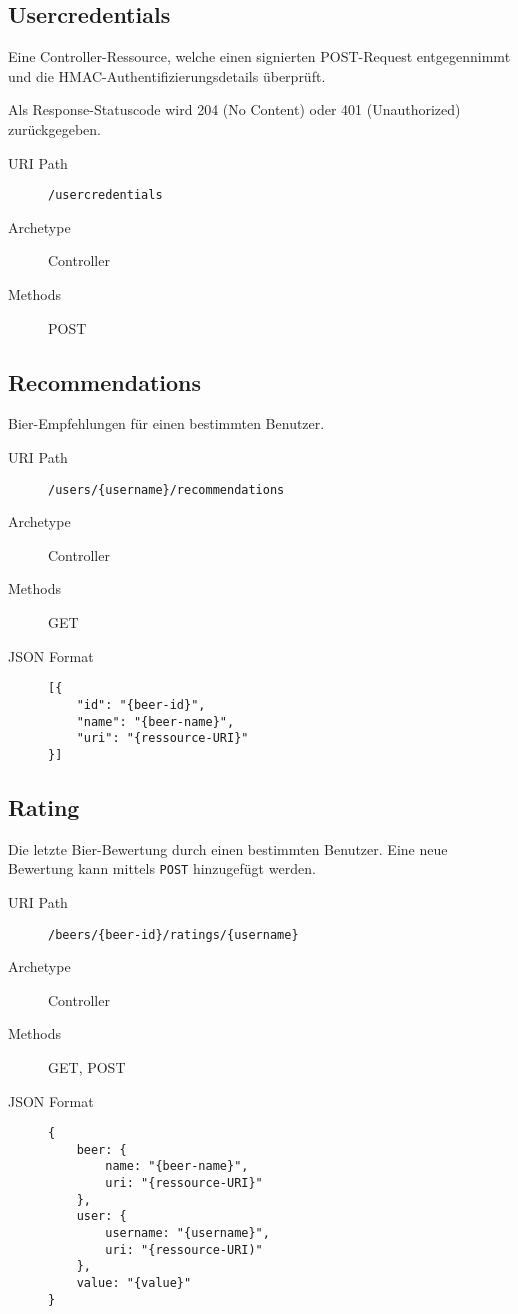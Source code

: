 \documentclass[10pt,a4paper]{scrartcl}
\begin{document}
\subsection{Usercredentials}

Eine Controller-Ressource, welche einen signierten POST-Request entgegennimmt und die
HMAC-Authentifizierungsdetails überprüft.

Als Response-Statuscode wird 204 (No Content) oder 401 (Unauthorized) zurückgegeben.

\begin{description}
	\item[URI Path] \texttt{/usercredentials}
	\item[Archetype] Controller
	\item[Methods] POST
\end{description}


\subsection{Recommendations}

Bier-Empfehlungen für einen bestimmten Benutzer.

\begin{description}
	\item[URI Path] \texttt{/users/\{username\}/recommendations}
	\item[Archetype] Controller
	\item[Methods] GET
	\item[JSON Format] \hfill
\begin{lstlisting}
[{
	"id": "{beer-id}",
	"name": "{beer-name}",
	"uri": "{ressource-URI}"
}]
\end{lstlisting}
\end{description}


\subsection{Rating}

Die letzte Bier-Bewertung durch einen bestimmten Benutzer. Eine neue Bewertung kann mittels \texttt{POST} hinzugefügt werden.

\begin{description}
	\item[URI Path] \texttt{/beers/\{beer-id\}/ratings/\{username\}}
	\item[Archetype] Controller
	\item[Methods] GET, POST
	\item[JSON Format] \hfill
\begin{lstlisting}
{
	beer: {
		name: "{beer-name}",
		uri: "{ressource-URI}"
	},
	user: {
		username: "{username}",
		uri: "{ressource-URI)"
	},
	value: "{value}"
}
	\end{lstlisting}
\end{description}
\end{document}
